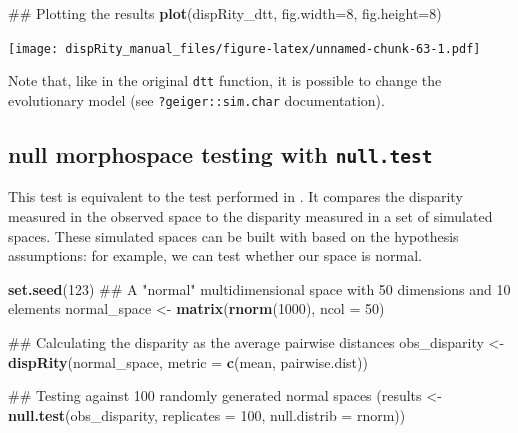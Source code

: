\documentclass[]{book}
\newenvironment{Shaded}{\begin{snugshade}}{\end{snugshade}}
\newcommand{\KeywordTok}[1]{\textcolor[rgb]{0.13,0.29,0.53}{\textbf{#1}}}
\newcommand{\DataTypeTok}[1]{\textcolor[rgb]{0.13,0.29,0.53}{#1}}
\newcommand{\DecValTok}[1]{\textcolor[rgb]{0.00,0.00,0.81}{#1}}
\newcommand{\StringTok}[1]{\textcolor[rgb]{0.31,0.60,0.02}{#1}}
\newcommand{\NormalTok}[1]{#1}
\theoremstyle{definition}
\theoremstyle{definition}
\theoremstyle{remark}
\begin{document}
\begin{Shaded}
\begin{Highlighting}[]
\NormalTok{## Plotting the results}
\KeywordTok{plot}\NormalTok{(dispRity_dtt, }\DataTypeTok{fig.width=}\DecValTok{8}\NormalTok{, }\DataTypeTok{fig.height=}\DecValTok{8}\NormalTok{)}
\end{Highlighting}
\end{Shaded}

\texttt{[image: dispRity\_manual\_files/figure-latex/unnamed-chunk-63-1.pdf]}

Note that, like in the original \texttt{dtt} function, it is possible to
change the evolutionary model (see \texttt{?geiger::sim.char}
documentation).

\subsection{\texorpdfstring{null morphospace testing with
\texttt{null.test}}{null morphospace testing with null.test}}\label{null-morphospace-testing-with-null.test}

This test is equivalent to the test performed in \citet{diaz2016global}.
It compares the disparity measured in the observed space to the
disparity measured in a set of simulated spaces. These simulated spaces
can be built with based on the hypothesis assumptions: for example, we
can test whether our space is normal.

\begin{Shaded}
\begin{Highlighting}[]
\KeywordTok{set.seed}\NormalTok{(}\DecValTok{123}\NormalTok{)}
\NormalTok{## A "normal" multidimensional space with 50 dimensions and 10 elements}
\NormalTok{normal_space <-}\StringTok{ }\KeywordTok{matrix}\NormalTok{(}\KeywordTok{rnorm}\NormalTok{(}\DecValTok{1000}\NormalTok{), }\DataTypeTok{ncol =} \DecValTok{50}\NormalTok{)}

\NormalTok{## Calculating the disparity as the average pairwise distances}
\NormalTok{obs_disparity <-}\StringTok{ }\KeywordTok{dispRity}\NormalTok{(normal_space, }\DataTypeTok{metric =} \KeywordTok{c}\NormalTok{(mean, pairwise.dist))}

\NormalTok{## Testing against 100 randomly generated normal spaces}
\NormalTok{(results <-}\StringTok{ }\KeywordTok{null.test}\NormalTok{(obs_disparity, }\DataTypeTok{replicates =} \DecValTok{100}\NormalTok{, }\DataTypeTok{null.distrib =}\NormalTok{ rnorm))}
\end{Highlighting}
\end{Shaded}
\end{document}
